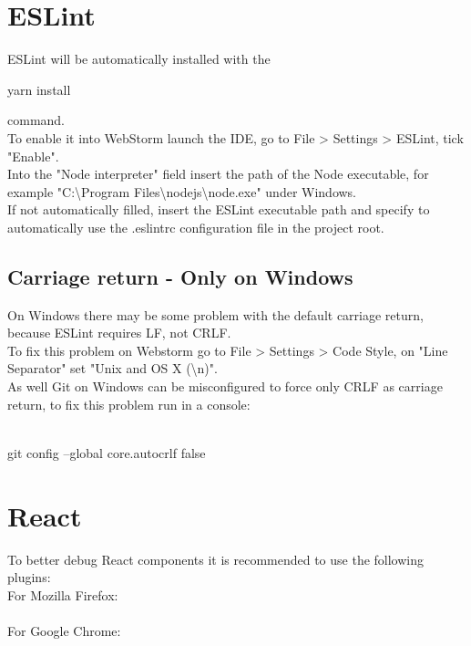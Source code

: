 \documentclass[ManualeSviluppatore]{subfiles}
\begin{document}
\section{ESLint}
ESLint will be automatically installed with the \begin{ttfamily}yarn install \end{ttfamily}command. \\
To enable it into WebStorm launch the IDE, go to File \textgreater{} Settings \textgreater{} ESLint, tick "Enable". \\
Into the "Node interpreter" field insert the path of the Node executable, for example "C:\textbackslash Program Files\textbackslash nodejs\textbackslash node.exe" under Windows. \\
If not automatically filled, insert the ESLint executable path and specify to automatically use the .eslintrc configuration file in the project root.\\

\subsection{Carriage return - Only on Windows}
On Windows there may be some problem with the default carriage return, because ESLint requires LF, not CRLF. \\
To fix this problem on Webstorm go to File \textgreater{} Settings \textgreater{} Code Style, on "Line Separator" set "Unix and OS X (\textbackslash{}n)". \\
As well Git on Windows can be misconfigured to force only CRLF as carriage return, to fix this problem run in a console: \\\\
\indent \begin{ttfamily}git config --global core.autocrlf false \end{ttfamily}

\section{React}
To better debug React components it is recommended to use the following plugins: \\
For Mozilla Firefox: \\
 \\
For Google Chrome: \\
 \\
\end{document}
